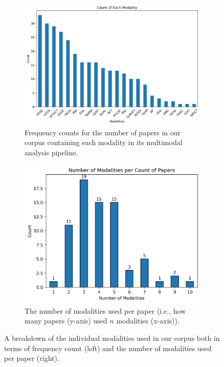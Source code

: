 \documentclass[manuscript,screen,review]{acmart}
\begin{document}
\begin{figure}[htbp]
    \centering    
    \begin{subfigure}[b]{0.45\textwidth}
        \includegraphics[width=\textwidth]{img/statistical_imgs/modalities.png}
        \caption{Frequency counts for the number of papers in our corpus containing each modality in its multimodal analysis pipeline.}
        \label{fig:modalities_freq}
    \end{subfigure}
    \hfill
    \begin{subfigure}[b]{0.45\textwidth}
        \includegraphics[width=\textwidth]{img/statistical_imgs/number of modalities per count of papers.png}
        \caption{The number of modalities used per paper (i.e., how many papers (y-axis) used $n$ modalities (x-axis)).}
        \label{fig:modalities_nums}
    \end{subfigure}
    \caption{A breakdown of the individual modalities used in our corpus both in terms of frequency count (left) and the number of modalities used per paper (right).}
    \label{fig:modalities}
\end{figure}
\end{document}
